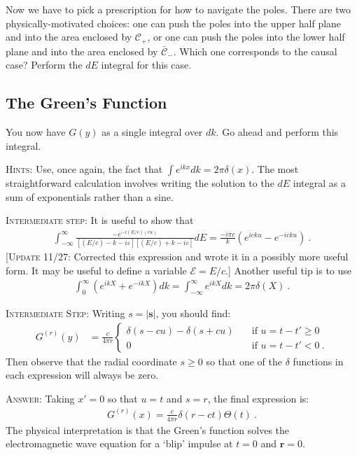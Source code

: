 \documentclass[12pt]{article}
\numberwithin{equation}{section}    %
\renewcommand{\vec}[1]{\mathbf{#1}} %
\begin{document}
Now we have to pick a prescription for how to navigate the poles. There are two physically-motivated choices: one can push the poles into the upper half plane and into the area enclosed by $\mathcal C_+$, or one can push the poles into the lower half plane and into the area enclosed by $\bar{\mathcal C}_-$. Which one corresponds to the causal case? Perform the $dE$ integral for this case.


\subsection{The Green's Function}

You now have $G(y)$ as a single integral over $dk$. Go ahead and perform this integral. 

\textsc{Hints}: Use, once again, the fact that $\int e^{ikx} dk = 2\pi \delta(x)$. The most straightforward calculation involves writing the solution to the $dE$ integral as a sum of exponentials rather than a sine. 

\textsc{Intermediate step}: It is useful to show that
\begin{align}
	\int_{-\infty}^\infty \frac{-e^{-i(E/c)(cu)}}{[(E/c)- k - i\varepsilon][(E/c)+k - i\varepsilon]}  dE = 
	\frac{-i\pi c}{k} \left(e^{icku}-e^{-icku}\right) \ .
\end{align}
\textcolor{green!50!black}{[\textsc{Update 11/27}: Corrected this expression and wrote it in a possibly more useful form. It may be useful to define a variable $\mathcal E = E/c$.]}
%
Another useful tip is to use
\begin{align}
	\int_0^\infty \left(e^{ikX} + e^{-ikX}\right) dk = 
	\int_{-\infty}^\infty e^{ikX} dk=
	2\pi \delta(X)
	 \ .
\end{align}


\textsc{Intermediate Step}: Writing $s = |\vec s|$, you should find:
\begin{align}
	G^{(r)}(y) &=
	\frac{c}{4\pi r}
	\left\{
	\begin{array}{ll}
		\delta(s-cu) - \delta(s+cu)
		&
		\quad\text{if $u=t-t' \geq 0$}
		\\
		0 & \quad\text{if $u=t-t' <0$} \ .
	\end{array}
	\right.
	\label{eq:Gr:Gs}
\end{align}
Then observe that the radial coordinate $s\geq 0$ so that one of the $\delta$ functions in each expression will always be zero. 

\textsc{Answer}:
Taking $x' = 0$ so that $u=t$ and $s = r$, the final expression is:
\begin{align}
	G^{(r)}(x) = \frac{c}{4\pi r} \delta(r-ct) \Theta(t) \ .
	\label{eq:3d:G}
\end{align}
The physical interpretation is that the Green's function solves the electromagnetic wave equation for a `blip' impulse at $t=0$ and $\vec{r} = 0$. 
\end{document}
